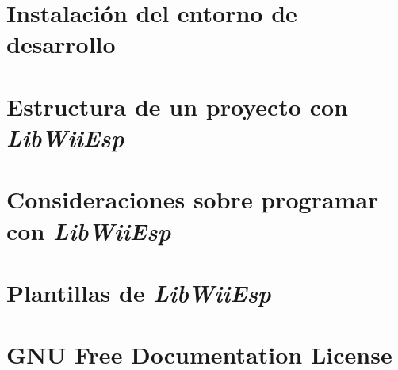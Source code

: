 \documentclass[a4paper,11pt]{article}
\begin{document}
\pagestyle{empty}

\pagestyle{plain}
\clearpage



\section{Instalación del entorno de desarrollo}


\section{Estructura de un proyecto con \emph{LibWiiEsp}}


\section{Consideraciones sobre programar con \emph{LibWiiEsp}}


\section{Plantillas de \emph{LibWiiEsp}}


\section{GNU Free Documentation License}

\end{document}
